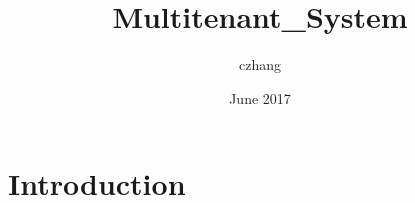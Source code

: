 \documentclass{article}
\title{Multitenant_System}
\author{czhang }
\date{June 2017}
\begin{document}
\maketitle

\section{Introduction}
\end{document}
